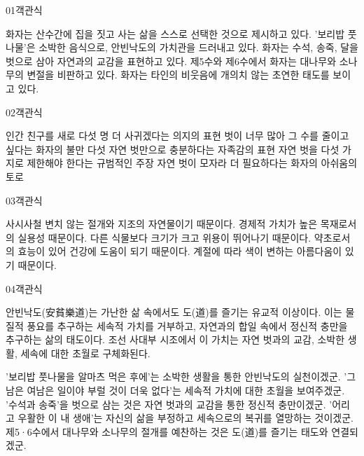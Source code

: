 \documentclass[fs85,seriesWit]{korfarm-base}
\begin{document}

\kfBeginMC
\begin{kfQBlock}{01}{객관식}
\begin{kfChoices}
\kfChoice 화자는 산수간에 집을 짓고 사는 삶을 스스로 선택한 것으로 제시하고 있다.
\kfChoice '보리밥 풋나물'은 소박한 음식으로, 안빈낙도의 가치관을 드러내고 있다.
\kfChoice 화자는 수석, 송죽, 달을 벗으로 삼아 자연과의 교감을 표현하고 있다.
\kfChoice 제5수와 제6수에서 화자는 대나무와 소나무의 변절을 비판하고 있다.
\kfChoice 화자는 타인의 비웃음에 개의치 않는 초연한 태도를 보이고 있다.
\end{kfChoices}
\end{kfQBlock}

\begin{kfQBlock}{02}{객관식}
\begin{kfChoices}
\kfChoice 인간 친구를 새로 다섯 명 더 사귀겠다는 의지의 표현
\kfChoice 벗이 너무 많아 그 수를 줄이고 싶다는 화자의 불만
\kfChoice 다섯 자연 벗만으로 충분하다는 자족감의 표현
\kfChoice 자연 벗을 다섯 가지로 제한해야 한다는 규범적인 주장
\kfChoice 자연 벗이 모자라 더 필요하다는 화자의 아쉬움의 토로
\end{kfChoices}
\end{kfQBlock}

\begin{kfQBlock}{03}{객관식}
\begin{kfChoices}
\kfChoice 사시사철 변치 않는 절개와 지조의 자연물이기 때문이다.
\kfChoice 경제적 가치가 높은 목재로서의 실용성 때문이다.
\kfChoice 다른 식물보다 크기가 크고 위용이 뛰어나기 때문이다.
\kfChoice 약초로서의 효능이 있어 건강에 도움이 되기 때문이다.
\kfChoice 계절에 따라 색이 변하는 아름다움이 있기 때문이다.
\end{kfChoices}
\end{kfQBlock}

\begin{kfQBlock}{04}{객관식}
\begin{kfEvidence}안빈낙도(安貧樂道)는 가난한 삶 속에서도 도(道)를 즐기는 유교적 이상이다. 이는 물질적 풍요를 추구하는 세속적 가치를 거부하고, 자연과의 합일 속에서 정신적 충만을 추구하는 삶의 태도이다. 조선 사대부 시조에서 이 가치는 자연 벗과의 교감, 소박한 생활, 세속에 대한 초월로 구체화된다.\end{kfEvidence}
\begin{kfChoices}
\kfChoice '보리밥 풋나물을 알마츠 먹은 후에'는 소박한 생활을 통한 안빈낙도의 실천이겠군.
\kfChoice '그 남은 여남은 일이야 부럴 것이 더욱 없다'는 세속적 가치에 대한 초월을 보여주겠군.
\kfChoice '수석과 송죽'을 벗으로 삼는 것은 자연 벗과의 교감을 통한 정신적 충만이겠군.
\kfChoice '어리고 우활한 이 내 생애'는 자신의 삶을 부정하고 세속으로의 복귀를 열망하는 것이겠군.
\kfChoice 제5·6수에서 대나무와 소나무의 절개를 예찬하는 것은 도(道)를 즐기는 태도와 연결되겠군.
\end{kfChoices}
\end{kfQBlock}
\end{document}
